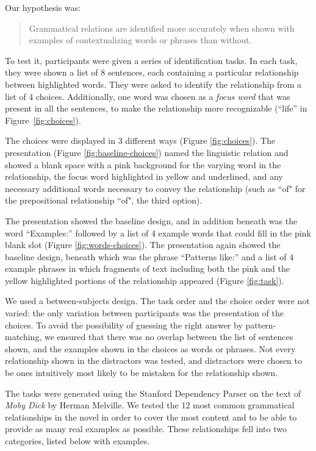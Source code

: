 
Our hypothesis was:
\begin{quote}
	Grammatical relations are identified more accurately when shown with examples of contextualizing words or phrases than without.
\end{quote}

To test it, participants were given a series of identification tasks. In each task, they were shown a list of 8 sentences, each containing a particular relationship between highlighted words. They were asked to identify the relationship from a list of 4 choices.  Additionally, one word was chosen as a \emph{focus word} that was present in all the sentences, to make the relationship more recognizable (``life'' in Figure~\ref{fig:choices}).

The choices were displayed in 3 different ways (Figure \ref{fig:choices}).  The  presentation
(Figure \ref{fig:baseline-choices}) named the linguistic relation and showed a blank space with a pink background for the varying word in the relationship, the focus word highlighted in yellow and underlined, and any necessary additional words necessary to convey the relationship (such as ``of" for the prepositional relationship ``of",  the third option).

The  presentation showed the baseline design, and in addition beneath was the word ``Examples:'' followed by a list of 4 example words that could fill in the pink blank slot (Figure \ref{fig:words-choices}).   The  presentation again showed the baseline design, beneath which was the phrase ``Patterns like:'' and a list of 4 example phrases in which fragments of text including both the pink and the yellow highlighted portions of the  relationship appeared (Figure \ref{fig:task}).

We used a between-subjects design. The task order and the choice order were not varied: the only variation between participants was the presentation of the choices. To avoid the possibility of  guessing the right answer by pattern-matching, we ensured that there was no overlap between the list of sentences shown, and the examples shown in the choices as words or phrases. Not every relationship shown in the distractors was tested, and distractors were chosen to be ones intuitively most likely to be mistaken for  the relationship shown.

The tasks were generated using the Stanford Dependency Parser \cite{de2006generating} on the text of \emph{Moby Dick} by Herman Melville. We tested the 12 most common grammatical relationships in the novel in order to cover the most content and to be able to provide as many real examples as possible. These relationships fell into two categories, listed below with examples.

